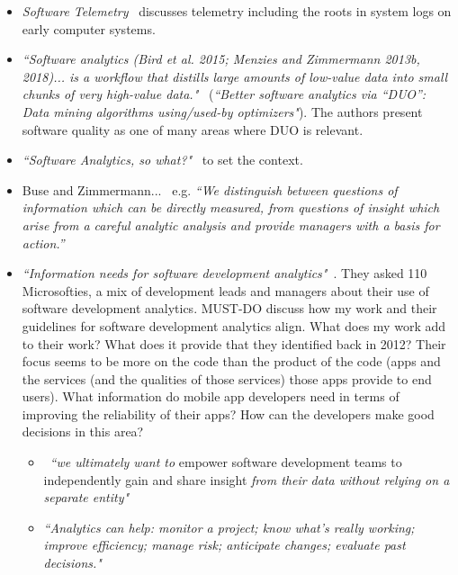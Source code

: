 \begin{itemize}
    
    \item \emph{Software Telemetry}~\citep{riedesel2021_software_telemetry} discusses telemetry including the roots in system logs on early computer systems.
    
    \item \emph{``Software analytics (Bird et al. 2015; Menzies and Zimmermann 2013b, 2018)... is a workflow that distills large amounts of low-value data into small chunks of very high-value data."}~\citep[page 2110]{agrawal2020_better_software_analytics_via_duo} (\emph{``Better software analytics via “DUO”: Data mining algorithms using/used-by optimizers"}). The authors present software quality as one of many areas where DUO is relevant. %
    
    \item \emph{``Software Analytics, so what?"}~\citep{menzies2013_software_analytics_so_what} to set the context.
    
    
    \item Buse and Zimmermann...~\cite{buse_analytics_2010} e.g. \emph{“We distinguish between questions of information which can be directly measured, from questions of insight which arise from a careful analytic analysis and provide managers with a basis for action.”}
    
    \item \emph{``Information needs for software development analytics"}~\citep{buse2012_information_needs_for_software_development_analytics}. They asked 110 Microsofties, a mix of development leads and managers about their use of software development analytics. MUST-DO discuss how my work and their guidelines for software development analytics align. What does my work add to their work? What does it provide that they identified back in 2012? Their focus seems to be more on the code than the product of the code (apps and the services (and the qualities of those services) those apps provide to end users). What information do mobile app developers need in terms of improving the reliability of their apps? How can the developers make good decisions in this area?
    \begin{itemize}
        \item ~\emph{``we ultimately want to} empower software development teams to independently gain and share insight \emph{from their data without relying on a separate entity"}
        \item \emph{``Analytics can help: monitor a project; know what's really working; improve efficiency; manage risk; anticipate changes; evaluate past decisions."}
        

\end{itemize}
\end{itemize}
